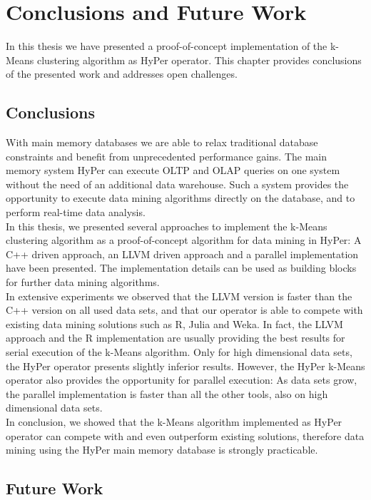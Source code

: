 \chapter{Conclusions and Future Work}\label{chapter:conclusion}
In this thesis we have presented a proof-of-concept implementation of the k-Means clustering algorithm as HyPer operator. This chapter provides conclusions of the presented work and addresses open challenges.

\section{Conclusions}
With main memory databases we are able to relax traditional database constraints and benefit from unprecedented performance gains. The main memory system HyPer can execute OLTP and OLAP queries on one system without the need of an additional data warehouse. Such a system provides the opportunity to execute data mining algorithms directly on the database, and to perform real-time data analysis. 
\\
In this thesis, we presented several approaches to implement the k-Means clustering algorithm as a proof-of-concept algorithm for data mining in HyPer: A C++ driven approach, an LLVM driven approach and a parallel implementation have been presented. The implementation details can be used as building blocks for further data mining algorithms.
\\
In extensive experiments we observed that the LLVM version is faster than the C++ version on all used data sets, and that our operator is able to compete with existing data mining solutions such as R, Julia and Weka. In fact, the LLVM approach and the R implementation are usually providing the best results for serial execution of the k-Means algorithm. Only for high dimensional data sets, the HyPer operator presents slightly inferior results. However, the HyPer k-Means operator also provides the opportunity for parallel execution: As data sets grow, the parallel implementation is faster than all the other tools, also on high dimensional data sets.
\\
In conclusion, we showed that the k-Means algorithm implemented as HyPer operator can compete with and even outperform existing solutions, therefore data mining using the HyPer main memory database is strongly practicable.

\section{Future Work}

